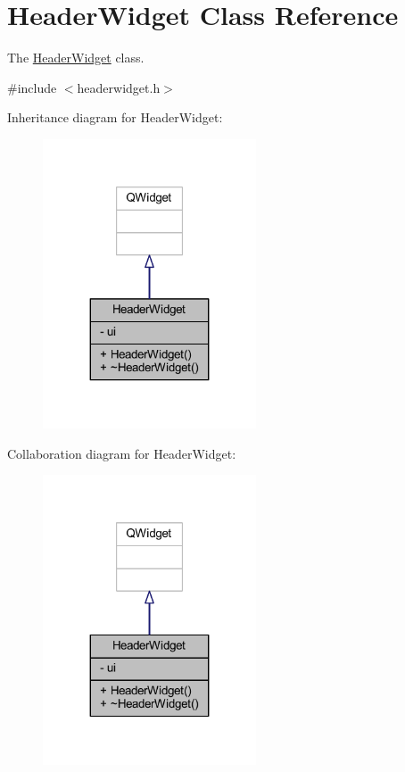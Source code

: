 \hypertarget{class_header_widget}{\section{Header\+Widget Class Reference}
\label{class_header_widget}
}


The \hyperlink{class_header_widget}{Header\+Widget} class.  




{\ttfamily \#include $<$headerwidget.\+h$>$}



Inheritance diagram for Header\+Widget\+:
\nopagebreak
\begin{figure}[H]
\begin{center}
\leavevmode
\includegraphics[width=179pt]{class_header_widget__inherit__graph}
\end{center}
\end{figure}


Collaboration diagram for Header\+Widget\+:
\nopagebreak
\begin{figure}[H]
\begin{center}
\leavevmode
\includegraphics[width=179pt]{class_header_widget__coll__graph}
\end{center}
\end{figure}
